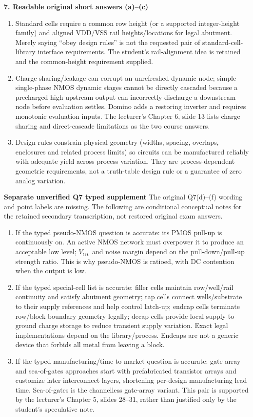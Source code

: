 \documentclass[10pt]{article}
\begin{document}
\textbf{7. Readable original short answers (a)--(c)}
\begin{enumerate}[label=(\alph*),leftmargin=7mm,itemsep=8pt]
\item Standard cells require a common row height (or a supported integer-height family) and aligned VDD/VSS rail heights/locations for legal abutment. Merely saying ``obey design rules'' is not the requested pair of standard-cell-library interface requirements. The student's rail-alignment idea is retained and the common-height requirement supplied.
\item Charge sharing/leakage can corrupt an unrefreshed dynamic node; simple single-phase NMOS dynamic stages cannot be directly cascaded because a precharged-high upstream output can incorrectly discharge a downstream node before evaluation settles. Domino adds a restoring inverter and requires monotonic evaluation inputs. The lecturer's Chapter 6, slide 13 lists charge sharing and direct-cascade limitations as the two course answers.
\item Design rules constrain physical geometry (widths, spacing, overlaps, enclosures and related process limits) so circuits can be manufactured reliably with adequate yield across process variation. They are process-dependent geometric requirements, not a truth-table design rule or a guarantee of zero analog variation.
\end{enumerate}
\newpage
\textbf{Separate unverified Q7 typed supplement}
The original Q7(d)--(f) wording and point labels are missing. The following are conditional conceptual notes for the retained secondary transcription, not restored original exam answers.
\begin{enumerate}[label=(\alph*),start=4,leftmargin=7mm,itemsep=9pt]
\item If the typed pseudo-NMOS question is accurate: its PMOS pull-up is continuously on. An active NMOS network must overpower it to produce an acceptable low level; $V_{OL}$ and noise margin depend on the pull-down/pull-up strength ratio. This is why pseudo-NMOS is ratioed, with DC contention when the output is low.
\item If the typed special-cell list is accurate: filler cells maintain row/well/rail continuity and satisfy abutment geometry; tap cells connect wells/substrate to their supply references and help control latch-up; endcap cells terminate row/block boundary geometry legally; decap cells provide local supply-to-ground charge storage to reduce transient supply variation. Exact legal implementations depend on the library/process. Endcaps are not a generic device that forbids all metal from leaving a block.
\item If the typed manufacturing/time-to-market question is accurate: gate-array and sea-of-gates approaches start with prefabricated transistor arrays and customize later interconnect layers, shortening per-design manufacturing lead time. Sea-of-gates is the channelless gate-array variant. This pair is supported by the lecturer's Chapter 5, slides 28--31, rather than justified only by the student's speculative note.
\end{enumerate}
\end{document}
